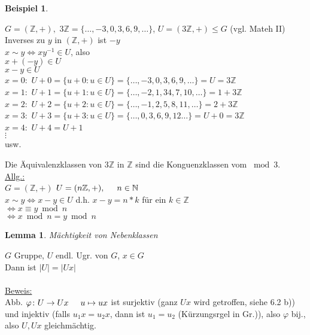 \documentclass[a4paper,11pt]{article}
\newtheorem{bsp}[definition]{Beispiel}
\newtheorem{lemma}[definition]{Lemma}
\newcommand{\hsp}{\hspace{5mm}}
\begin{document}
\begin{bsp}
\end{bsp}
$G=(\mathbb{Z},+),$ $3\mathbb{Z}=\{\hdots,-3,0,3,6,9,\hdots\}$, $U=(3\mathbb{Z},+)\leq G$ (vgl. Mateh II) \\
Inverses zu $y$ in $(\mathbb{Z},+)$ ist $-y$ \\
$x\sim y\Leftrightarrow xy^{-1}\in U$, also \\
$x+(-y)\in U$ \\
$x-y\in U$ \\
$x=0:$ $U+0=\{u+0\colon u\in U\}=\{\hdots,-3,0,3,6,9,\hdots\}=U=3\mathbb{Z}$ \\
$x=1:$ $U+1=\{u+1\colon u\in U\}=\{\hdots,-2,1,34,7,10,\hdots\}=1+3\mathbb{Z}$ \\
$x=2:$ $U+2=\{u+2\colon u\in U\}=\{\hdots,-1,2,5,8,11,\hdots\}=2+3\mathbb{Z}$ \\
$x=3:$ $U+3=\{u+3\colon u\in U\}=\{\hdots,0,3,6,9,12\hdots\}=U+0=3\mathbb{Z}$ \\
$x=4:$ $U+4=U+1$ \\
$\vdots$ \\
usw. \\

\newpage

Die Äquivalenzklassen von $3\mathbb{Z}$ in $\mathbb{Z}$ sind die Konguenzklassen vom $\bmod3$. \\
\underline{Allg.:} \\
$G=(\mathbb{Z},+)$ $U=(n\mathbb{Z},+),\hsp n\in\mathbb{N}$ \\
$x\sim y\Leftrightarrow x-y\in U$ d.h. $x-y=n*k$ für ein $k\in\mathbb{Z}$ \\
$\Leftrightarrow x\equiv y\bmod n$ \\
$\Leftrightarrow x\bmod n=y\bmod n$

\begin{lemma}
	Mächtigkeit von Nebenklassen
\end{lemma}
$G$ Gruppe, $U$ endl. Ugr. von $G$, $x\in G$ \\
Dann ist $\vert U\vert=\vert Ux\vert$ \\
\\
\underline{Beweis:} \\
Abb. $\varphi\colon U\rightarrow Ux\hsp u\mapsto ux$ ist surjektiv (ganz $Ux$ wird getroffen, siehe 6.2 b)) \\
und injektiv (falls $u_1x=u_2x$, dann ist $u_1=u_2$ (Kürzungsrgel in Gr.)), also $\varphi$ bij., also $U,Ux$ gleichmächtig.  
\end{document}
